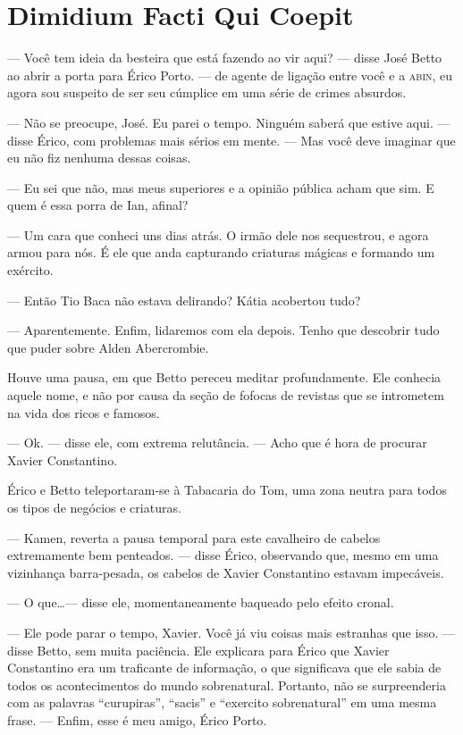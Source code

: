 \chapter{Dimidium Facti Qui Coepit}


--- Você tem ideia da besteira que está fazendo ao vir aqui? --- disse José Betto ao abrir a porta para Érico Porto. --- de agente de ligação entre você e a \textsc{abin}, eu agora sou suspeito de ser seu cúmplice em uma série de crimes absurdos.

--- Não se preocupe, José. Eu parei o tempo. Ninguém saberá que estive aqui. --- disse Érico, com problemas mais sérios em mente. --- Mas você deve imaginar que eu não fiz nenhuma dessas coisas.

--- Eu sei que não, mas meus superiores e a opinião pública acham que sim. E quem é essa porra de Ian, afinal?

--- Um cara que conheci uns dias atrás. O irmão dele nos sequestrou, e agora armou para nós. É ele que anda capturando criaturas mágicas e formando um exército.

--- Então Tio Baca não estava delirando? Kátia acobertou tudo?

--- Aparentemente. Enfim, lidaremos com ela depois. Tenho que descobrir tudo que puder sobre Alden Abercrombie.

Houve uma pausa, em que Betto pereceu meditar profundamente. Ele conhecia aquele nome, e não por causa da seção de fofocas de revistas que se intrometem na vida dos ricos e famosos.

--- Ok. --- disse ele, com extrema relutância. --- Acho que é hora de procurar Xavier Constantino.



Érico e Betto teleportaram-se à Tabacaria do Tom, uma zona neutra para todos os tipos de negócios e criaturas.

--- Kamen, reverta a pausa temporal para este cavalheiro de cabelos extremamente bem penteados. --- disse Érico, observando que, mesmo em uma vizinhança barra-pesada, os cabelos de Xavier Constantino estavam impecáveis.

--- O que\ldots --- disse ele, momentaneamente baqueado pelo efeito cronal.

--- Ele pode parar o tempo, Xavier. Você já viu coisas mais estranhas que isso. --- disse Betto, sem muita paciência. Ele explicara para Érico que Xavier Constantino era um traficante de informação, o que significava que ele sabia de todos os acontecimentos do mundo sobrenatural. Portanto, não se surpreenderia com as palavras “curupiras”, “sacis” e “exercito sobrenatural” em uma mesma frase. --- Enfim, esse é meu amigo, Érico Porto.

